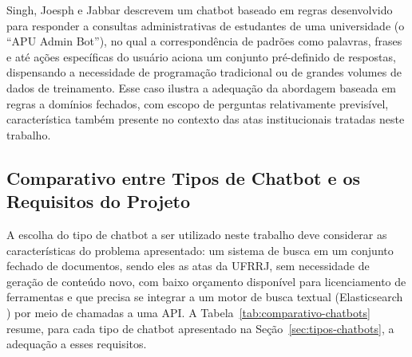 Singh, Joesph e Jabbar \cite{singh2019rulebased} descrevem um chatbot baseado em regras desenvolvido para responder a consultas administrativas de estudantes de uma universidade (o ``APU Admin Bot''), no qual a correspondência de padrões como palavras, frases e até ações específicas do usuário aciona um conjunto pré-definido de respostas, dispensando a necessidade de programação tradicional ou de grandes volumes de dados de treinamento. Esse caso ilustra a adequação da abordagem baseada em regras a domínios fechados, com escopo de perguntas relativamente previsível, característica também presente no contexto das atas institucionais tratadas neste trabalho.

\subsection{Comparativo entre Tipos de Chatbot e os Requisitos do Projeto}\label{sec:comparativo-chatbots}

A escolha do tipo de chatbot a ser utilizado neste trabalho deve considerar as características do problema apresentado: um sistema de busca em um conjunto fechado de documentos, sendo eles as atas da UFRRJ, sem necessidade de geração de conteúdo novo, com baixo orçamento disponível para licenciamento de ferramentas e que precisa se integrar a um motor de busca textual (Elasticsearch \cite{IBMElasticsearch}) por meio de chamadas a uma API. A Tabela~\ref{tab:comparativo-chatbots} resume, para cada tipo de chatbot apresentado na Seção~\ref{sec:tipos-chatbots}, a adequação a esses requisitos.

